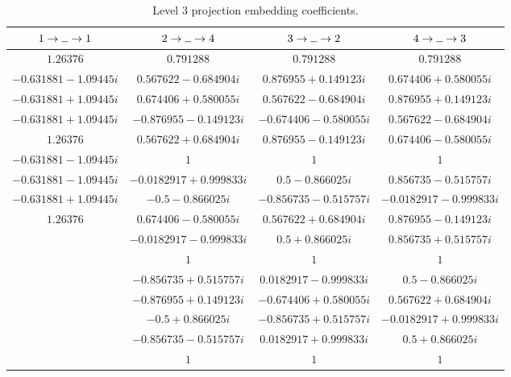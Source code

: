 \begin{table}
    \centering
    \begin{tabular}{|cccc|} \hline
        $1\to\blank\to1$                    & $2\to\blank\to4$                  & $3\to\blank\to2$               & $4\to\blank\to3$ \\ \hline\hline
        $1.26376$              & $0.791288$                & $0.791288 $              & $0.791288$ \\
        $-0.631881-1.09445 i$   & $0.567622 - 0.684904 i$   & $0.876955 + 0.149123 i$  & $0.674406 + 0.580055 i$ \\
        $-0.631881+1.09445 i$   & $0.674406 + 0.580055 i$   & $0.567622 - 0.684904 i$  & $0.876955 + 0.149123 i$ \\
        $-0.631881+1.09445 i$   & $-0.876955 - 0.149123 i$  & $-0.674406 - 0.580055 i$ & $0.567622 - 0.684904 i$ \\
        $1.26376$               & $0.567622 + 0.684904 i$   & $0.876955 - 0.149123 i$ & $0.674406 - 0.580055 i$ \\
        $-0.631881-1.09445 i$   & $1$                       & $1$                      & $1$ \\
        $-0.631881-1.09445 i$   & $-0.0182917 + 0.999833 i$ & $0.5 - 0.866025 i$       & $0.856735 - 0.515757 i$ \\
        $-0.631881+1.09445i$    & $-0.5 - 0.866025 i$       & $-0.856735 - 0.515757 i$ & $-0.0182917 - 0.999833 i$ \\
        $1.26376$               & $0.674406 - 0.580055 i$   & $0.567622 + 0.684904 i$  & $0.876955 - 0.149123 i$ \\ 
                              & $-0.0182917 - 0.999833 i$ & $0.5 + 0.866025 i$       & $0.856735 + 0.515757 i$ \\
                              & $1$                       & $1$                      & $1$ \\
                              & $-0.856735 + 0.515757 i$  & $0.0182917 - 0.999833 i$ & $0.5 - 0.866025 i$ \\
                              & $-0.876955 + 0.149123 i$  & $-0.674406 + 0.580055 i$ & $0.567622 + 0.684904 i$ \\
                              & $-0.5 + 0.866025 i$       & $-0.856735 + 0.515757 i$ & $-0.0182917 + 0.999833 i$ \\
                              & $-0.856735 - 0.515757 i$  & $0.0182917 + 0.999833 i$ & $0.5 + 0.866025 i$ \\
                              & $1$                       & $1$                      & $1$ \\ \hline
    \end{tabular}
    \caption{Level 3 projection embedding coefficients.}
    \label{tab:lvl-3-proj-coefs}
\end{table}




